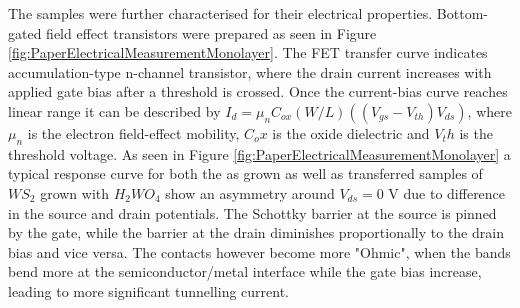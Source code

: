 \documentclass[12pt]{article}
\begin{document}
The samples were further characterised for their electrical properties. Bottom-gated field effect transistors were prepared as seen in Figure \ref{fig:PaperElectricalMeasurementMonolayer}. The FET transfer curve indicates accumulation-type n-channel transistor, where the drain current increases with applied gate bias after a threshold is crossed. Once the current-bias curve reaches linear range it can be described by $I_d = {\mu}_nC_{ox}(W/L) ((V_{gs}-V_{th})V_{ds})$, where ${\mu}_n$ is the electron field-effect mobility, $C_ox$ is the oxide dielectric and $V_th$ is the threshold voltage. As seen in Figure \ref{fig:PaperElectricalMeasurementMonolayer} a typical response curve for both the as grown as well as transferred samples of $WS_2$ grown with $H_2WO_4$ show an asymmetry around $V_{ds}=0$ V due to difference in the source and drain potentials. The Schottky barrier at the source is pinned by the gate, while the barrier at the drain diminishes proportionally to the drain bias and vice versa. The contacts however become more "Ohmic", when the bands bend more at the semiconductor/metal interface while the gate bias increase, leading to more significant tunnelling current.
\end{document}
